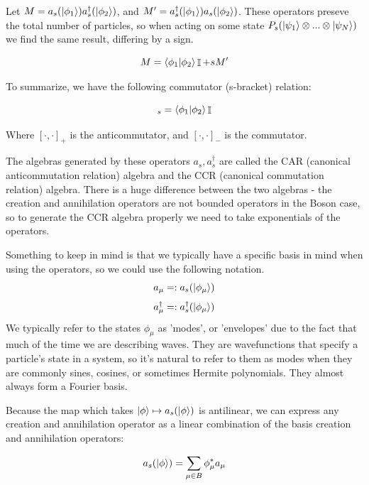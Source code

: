 \documentclass{article}
\DeclareMathOperator{\II}{\mathbb{I}}
\newcommand{\create}[1]{a^\dagger_s(#1)}
\newcommand{\annih}[1]{a_s(#1)}
\begin{document}
Let $M = \annih{\ket{\phi_1}}\create{\ket{\phi_2}}$, and $M'=\create{\ket{\phi_1}}\annih{\ket{\phi_2}}$. These operators preseve the total number of particles, so when acting on some state $P_s(\ket{\psi_1}\otimes...\otimes\ket{\psi_N})$ we find the same result, differing by a sign.

\[M=\braket{\phi_1}{\phi_2}\II+sM'\]

To summarize, we have the following commutator (s-bracket) relation:

\begin{equation}
[\create{\ket{\phi_1}},\annih{\ket{\phi_2}}]_s=\braket{\phi_1}{\phi_2}\II
\end{equation}

Where $[\cdot,\cdot]_+$ is the anticommutator, and $[\cdot,\cdot]_-$ is the commutator.

The algebras generated by these operators $a_s,a^\dagger_s$ are called the CAR (canonical anticommutation relation) algebra and the CCR (canonical commutation relation) algebra. There is a huge difference between the two algebras - the creation and annihilation operators are not bounded operators in the Boson case, so to generate the CCR algebra properly we need to take exponentials of the operators. 

Something to keep in mind is that we typically have a specific basis in mind when using the operators, so we could use the following notation.
\begin{equation}
a_\mu =: a_s(\ket{\phi_\mu})
\end{equation}
\begin{equation}
a_\mu^\dagger =: a_s^\dagger(\ket{\phi_\mu})
\end{equation}
We typically refer to the states $\phi_\mu$ as 'modes', or 'envelopes' due to the fact that much of the time we are describing waves. They are wavefunctions that specify a particle's state in a system, so it's natural to refer to them as modes when they are commonly sines, cosines, or sometimes Hermite polynomials. They almost always form a Fourier basis. 

Because the map which takes $\ket{\phi} \mapsto a_s(\ket{\phi})$ is antilinear, we can express any creation and annihilation operator as a linear combination of the basis creation and annihilation operators:

\begin{equation}
a_s(\ket{\phi}) = \sum_{\mu \in B}\phi_\mu^*a_\mu
\end{equation}
\end{document}
